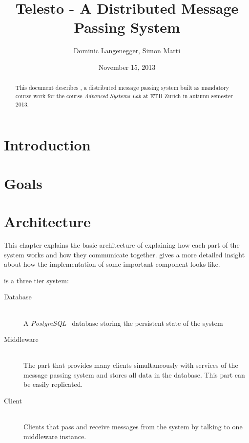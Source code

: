 \documentclass[a4paper, oneside]{csthesis}
\title{Telesto - A Distributed Message Passing System}
\author{Dominic Langenegger, Simon Marti}
\institute{Advanced Systems Lab 2013 \\[2pt]
Systems Group \\[2pt]
ETH Z\"urich}
\date{November 15, 2013}
\begin{document}
\frontmatter
\maketitle %

\cleardoublepage



\begin{abstract}
	This document describes \telesto, a distributed message passing system
	built as mandatory course work for the course {\it Advanced Systems Lab} at ETH
	Zurich in autumn semester 2013.
	
	
	
\end{abstract}

\tableofcontents

\mainmatter %

\chapter{Introduction}
	


\chapter{Goals}

	
\chapter{Architecture}
    This chapter explains the basic architecture of \telesto{} explaining how each
    part of the system works and how they communicate together.
     gives a more detailed insight about how the
    implementation of some important component looks like.

    \telesto{} is a three tier system:
    \begin{description}
        \item[Database] \ \\
            A {\it PostgreSQL}~ database storing the persistent state of the system
        \item[Middleware] \ \\
            The part that provides many clients simultaneously with services of
            the message passing system and stores all data in the database. This
            part can be easily replicated.
        \item[Client] \ \\
            Clients that pass and receive messages from the system by talking to
            one middleware instance.
    \end{description}
\end{document}
